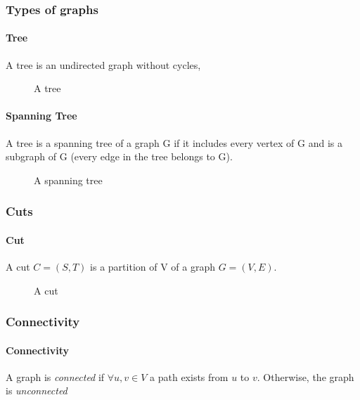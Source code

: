 \subsubsection{Types of graphs}

\paragraph{Tree}
A tree is an undirected graph without cycles,

\begin{figure}[!h]
  \begin{center}
    
  \end{center}
  \caption{A tree}
\end{figure}

\paragraph{Spanning Tree}
A tree is a spanning tree of a graph G if it includes every vertex of G and is a subgraph of G (every edge in the tree belongs to G).

\begin{figure}[!h]
  \begin{center}
    
  \end{center}
  \caption{A spanning tree}
\end{figure}


\subsubsection{Cuts}
\paragraph{Cut}A cut $C=(S,T)$ is a partition of V of a graph $G=(V,E)$.

\begin{figure}[!h]
  \begin{center}
    
  \end{center}
  \caption{A cut}
\end{figure}


\subsubsection{Connectivity}
\paragraph{Connectivity}
A graph  is {\em connected} if $\forall u,v \in V$ a path exists from $u$
to $v$. Otherwise, the graph is {\em unconnected}

